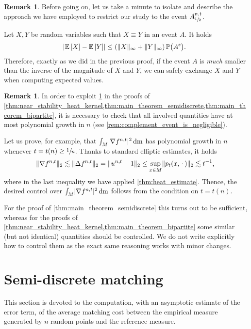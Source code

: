 \documentclass[JEP,XML,SOM,Unicode]{cedram}
\newcounter{results}[section]
\theoremstyle{plain}
\theoremstyle{definition}
\newtheorem{remark}[results]{Remark}
\numberwithin{equation}{section}
\renewcommand{\complement}{\ensuremath{\mathsf{c}}}\newcommand{\de}{\ensuremath{\,\mathrm d}}
\newcommand{\E}[1]{\ensuremath{\operatorname{\mathbb{E}}\left[#1\right]}}
\newcommand{\emptyparam}{\ensuremath{\,\cdot\,}}
\newcommand{\lapl}{\ensuremath{\Delta}}
\newcommand{\bP}[1]{\ensuremath{\operatorname{\mathbb{P}}\bigl(#1\bigr)}}
\renewcommand{\comma}{\ensuremath{\text{, }}}
\newcommand{\comma}{\ensuremath{\text{, }}}
\newcommand{\fullstop}{\ensuremath{\text{. }}}
\newcommand{\m}{\ensuremath{\mathrm m}}
\DeclarePairedDelimiter\abs{\lvert}{\rvert}
\DeclarePairedDelimiter\norm{\lVert}{\rVert}
\begin{document}
\begin{remark}\label{rem:easy_restriction_rule}
Before going on, let us take a minute to isolate and describe the approach we have employed to
restrict our study to the event $A^{n,t}_{\sfrac12}$.

Let $X, Y$ be random variables such that $X\equiv Y$ in an event $A$. It holds
\begin{equation*}
\abs*{\E{X}-\E{Y}}
\le (\norm{X}_\infty+\norm{Y}_\infty)\bP{A^\complement} \fullstop
\end{equation*}
Therefore, exactly as we did in the previous proof, if the event $A$ is \emph{much} smaller than the inverse
of the magnitude of $X$ and $Y$, we can safely exchange $X$ and $Y$ when computing expected values.
\end{remark}
\begin{remark}
In order to exploit \cref{rem:easy_restriction_rule} in the proofs of
\cref{thm:near_stability_heat_kernel,thm:main_theorem_semidiscrete,thm:main_theorem_bipartite},
it is necessary to check that all involved quantities have at most polynomial growth in $n$
(see \cref{rem:complement_event_is_negligible}).

Let us prove, for example, that $\int_M \abs{\nabla f^{n,t}}^2\de\m$ has polynomial
growth in $n$ whenever $t=t(n)\ge \sfrac1n$. Thanks to standard elliptic estimates, it holds
\begin{equation*}
\norm{\nabla f^{n,t}}_2 \lesssim \norm{\lapl f^{n,t}}_2 = \norm{u^{n,t}-1}_2
\le \sup_{x\in M}\norm{p_t(x,\emptyparam)}_2 \lesssim t^{-1}\comma
\end{equation*}
where in the last inequality we have applied \cref{thm:heat_estimate}. Thence, the desired
control over $\int_M \abs{\nabla f^{n,t}}^2\de\m$ follows from the condition on $t=t(n)$.

For the proof of \cref{thm:main_theorem_semidiscrete} this turns out to be sufficient, whereas
for the proofs of \cref{thm:near_stability_heat_kernel,thm:main_theorem_bipartite} some similar
(but not identical) quantities should be controlled.
We do not write explicitly how to control them as the exact same reasoning works with minor
changes.
\end{remark}

\section{Semi-discrete matching}\label{sec:semidiscrete_matching}
This section is devoted to the computation, with an asymptotic estimate of the error term, of the average
matching cost between the empirical measure generated by $n$ random points and the reference measure.
\end{document}
